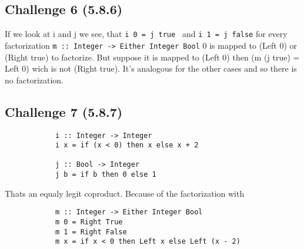 \documentclass[11pt]{article}
\begin{document}
    \subsection*{Challenge 6 (5.8.6)}
        If we look at i and j we see, that \texttt{i 0 = j true } and \texttt{i 1 = j false} for every factorization \texttt{m :: Integer -> Either Integer Bool}
        0 is mapped to (Left 0) or (Right true) to factorize. But suppose it is mapped to (Left 0) then (m (j true) = Left 0) wich is not (Right true). It's analogous for the other cases and so there is no factorization.

    \subsection*{Challenge 7 (5.8.7)}
        \begin{verbatim}
            i :: Integer -> Integer
            i x = if (x < 0) then x else x + 2

            j :: Bool -> Integer
            j b = if b then 0 else 1
        \end{verbatim}

        Thats an equaly legit coproduct. Because of the factorization with 
        \begin{verbatim}
            m :: Integer -> Either Integer Bool
            m 0 = Right True
            m 1 = Right False 
            m x = if x < 0 then Left x else Left (x - 2)
        \end{verbatim}
\end{document}
